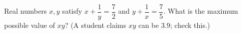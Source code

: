 Real numbers $x,y$ satisfy $x+\dfrac{1}{y}=\dfrac{7}{2}$ and $y+\dfrac{1}{x}=\dfrac{7}{5}$. What is the maximum possible value of $xy$? (A student claims $xy$ can be $3.9$; check this.)
